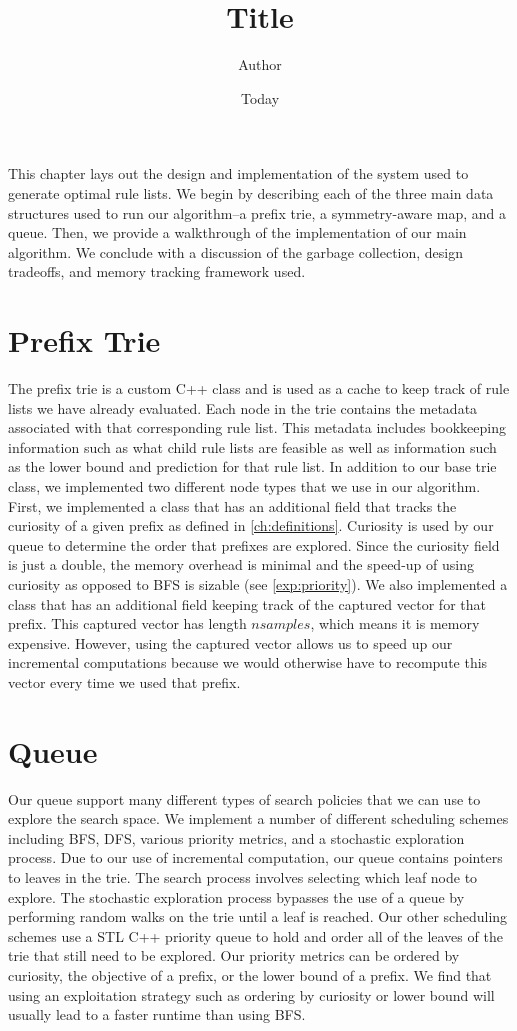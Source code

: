 \documentclass[]{article}
\begin{document}
\title{Title}
\author{Author}
\date{Today}
\maketitle

This chapter lays out the design and implementation of the system used to generate optimal rule lists. 
We begin by describing each of the three main data structures used to run our algorithm--a prefix trie, a symmetry-aware map, and a queue. 
Then, we provide a walkthrough of the implementation of our main algorithm.
We conclude with a discussion of the garbage collection, design tradeoffs, and memory tracking framework used.

\section{Prefix Trie}
The prefix trie is a custom C++ class and is used as a cache to keep track of rule lists we have already evaluated. 
Each node in the trie contains the metadata associated with that corresponding rule list. 
This metadata includes bookkeeping information such as what child rule lists are feasible as well as information such as the lower bound and prediction for that rule list.
In addition to our base trie class, we implemented two different node types that we use in our algorithm.
First, we implemented a class that has an additional field that tracks the curiosity of a given prefix as defined in \ref{ch:definitions}.
Curiosity is used by our queue to determine the order that prefixes are explored.
Since the curiosity field is just a double, the memory overhead is minimal and the speed-up of using curiosity as opposed to BFS is sizable (see \ref{exp:priority}).
We also implemented a class that has an additional field keeping track of the captured vector for that prefix.
This captured vector has length $nsamples$, which means it is memory expensive.
However, using the captured vector allows us to speed up our incremental computations because we would otherwise have to recompute this vector every time we used that prefix.

\section{Queue}\label{sec:queue}
Our queue support many different types of search policies that we can use to explore the search space.
We implement a number of different scheduling schemes including BFS, DFS, various priority metrics, and a stochastic exploration process.
Due to our use of incremental computation, our queue contains pointers to leaves in the trie.
The search process involves selecting which leaf node to explore.
The stochastic exploration process bypasses the use of a queue by performing random walks on the trie until a leaf is reached.
Our other scheduling schemes use a STL C++ priority queue to hold and order all of the leaves of the trie that still need to be explored.
Our priority metrics can be ordered by curiosity, the objective of a prefix, or the lower bound of a prefix.
We find that using an exploitation strategy such as ordering by curiosity or lower bound will usually lead to a faster runtime than using BFS.
\end{document}
